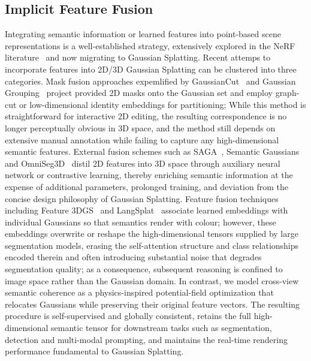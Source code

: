 \documentclass[numbers]{article}
\begin{document}
\subsection{Implicit Feature Fusion}
Integrating semantic information or learned features into point-based scene representations is a well-established strategy, extensively explored in the NeRF literature~\cite{nerfsos,lerf,Dnerf,3dv,Inplace,P3su} and now migrating to Gaussian Splatting. Recent attemps to incorporate features into 2D/3D Gaussian Splatting can be clustered into three categories. Mask fusion approaches expemlified by GaussianCut~\cite{gaussiancut} and Gaussian Grouping~\cite{gaussian_grouping} project provided 2D masks onto the Gaussian set and employ graph-cut or low-dimensional identity embeddings for partitioning; While this method is straightforward for interactive 2D editing, the resulting correspondence is no longer perceptually obvious in 3D space, and the method still depends on extensive manual annotation while failing to capture any high-dimensional semantic features. External fusion schemes such as SAGA~\cite{saga}, Semantic Gaussians~\cite{semanticgaussian} and OmniSeg3D~\cite{omniseg3d} distil 2D features into 3D space through auxiliary neural network or contrastive learning, thereby enriching semantic information at the expense of additional parameters, prolonged training, and deviation from the concise design philosophy of Gaussian Splatting. Feature fusion techniques including Feature 3DGS~\cite{featureGS} and LangSplat~\cite{langsplat} associate learned embeddings with individual Gaussians so that semantics render with colour; however, these embeddings overwrite or reshape the high-dimensional tensors supplied by large segmentation models, erasing the self-attention structure and class relationships encoded therein and often introducing substantial noise that degrades segmentation quality; as a consequence, subsequent reasoning is confined to image space rather than the Gaussian domain. In contrast, we model cross-view semantic coherence as a physics-inspired potential-field optimization that relocates Gaussians while preserving their original feature vectors. The resulting procedure is self-supervised and globally consistent, retains the full high-dimensional semantic tensor for downstream tasks such as segmentation, detection and multi-modal prompting, and maintains the real-time rendering performance fundamental to Gaussian Splatting.
\end{document}
